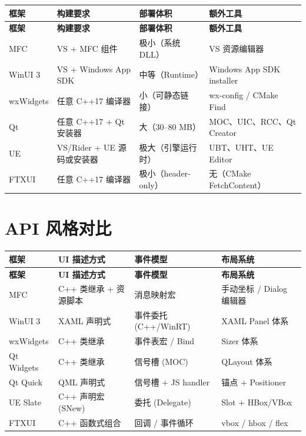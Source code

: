 \documentclass[12pt,a4paper,fontset=fandol]{ctexbook}
\begin{document}
\begin{small}
\begin{longtable}{@{}>{\raggedright}p{2.2cm} >{\raggedright}p{3.5cm}
  >{\raggedright}p{3.0cm} >{\raggedright\arraybackslash}p{4.0cm}@{}}
\toprule
\textbf{框架} & \textbf{构建要求} & \textbf{部署体积} &
  \textbf{额外工具} \\
\midrule
\endfirsthead
\toprule
\textbf{框架} & \textbf{构建要求} & \textbf{部署体积} &
  \textbf{额外工具} \\
\midrule
\endhead
MFC & VS + MFC 组件 & 极小（系统 DLL）&
  VS 资源编辑器 \\
\addlinespace
WinUI 3 & VS + Windows App SDK & 中等（Runtime）&
  Windows App SDK installer \\
\addlinespace
wxWidgets & 任意 C++17 编译器 & 小（可静态链接）&
  wx-config / CMake Find \\
\addlinespace
Qt & 任意 C++17 + Qt 安装器 & 大（30--80 MB）&
  MOC、UIC、RCC、Qt Creator \\
\addlinespace
UE & VS/Rider + UE 源码或安装器 & 极大（引擎运行时）&
  UBT、UHT、UE Editor \\
\addlinespace
FTXUI & 任意 C++17 编译器 & 极小（header-only）&
  无（CMake FetchContent） \\
\bottomrule
\end{longtable}
\end{small}

\section{API 风格对比}

\begin{small}
\begin{longtable}{@{}>{\raggedright}p{2.2cm} >{\raggedright}p{2.8cm}
  >{\raggedright}p{2.8cm} >{\raggedright\arraybackslash}p{4.8cm}@{}}
\toprule
\textbf{框架} & \textbf{UI 描述方式} & \textbf{事件模型} &
  \textbf{布局系统} \\
\midrule
\endfirsthead
\toprule
\textbf{框架} & \textbf{UI 描述方式} & \textbf{事件模型} &
  \textbf{布局系统} \\
\midrule
\endhead
MFC & C++ 类继承 + 资源脚本 & 消息映射宏 &
  手动坐标 / Dialog 编辑器 \\
\addlinespace
WinUI 3 & XAML 声明式 & 事件委托 (C++/WinRT) &
  XAML Panel 体系 \\
\addlinespace
wxWidgets & C++ 类继承 & 事件表宏 / Bind &
  Sizer 体系 \\
\addlinespace
Qt Widgets & C++ 类继承 & 信号槽 (MOC) &
  QLayout 体系 \\
\addlinespace
Qt Quick & QML 声明式 & 信号槽 + JS handler &
  锚点 + Positioner \\
\addlinespace
UE Slate & C++ 声明宏 (SNew) & 委托 (Delegate) &
  Slot + HBox/VBox \\
\addlinespace
FTXUI & C++ 函数式组合 & 回调 / 事件循环 &
  vbox / hbox / flex \\
\bottomrule
\end{longtable}
\end{small}
\end{document}
